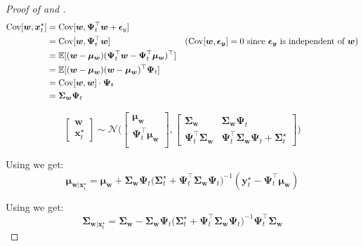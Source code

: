 \documentclass{article}
\begin{document}
\begin{proof}[Proof of  and ]
\begin{align}
  \mathrm{Cov}[\bm{w}, \bm{x}_t^{\star}] &= \mathrm{Cov}[\bm{w}, \bm{\Psi}^\top_t\bm{w} + \bm{\epsilon}_y]\\
                                         &= \mathrm{Cov}[\bm{w}, \bm{\Psi}^\top_t\bm{w}] & ( \mathrm{Cov}[\bm{w}, \bm{\epsilon_y}] = 0 \text{ since } \bm{\epsilon_y} \text{ is independent of } \bm{w})\\
                                         &= \operatorname{\mathbb{E}}[(\bm{w} - \bm{\mu_{w}})(\bm{\Psi}^\top_t\bm{w} - \bm{\Psi}^\top_t\bm{\mu_{w}})^{\top}]\\
                                         &= \operatorname{\mathbb{E}}[(\bm{w} - \bm{\mu_{w}})(\bm{w} - \bm{\mu_{w}})^{\top}\bm{\Psi}_t]\\
                                         &= \mathrm{Cov}[\bm{w}, \bm{w}] \cdot \bm{\Psi}_t\\
                                         &= \bm{\Sigma_{w}} \bm{\Psi}_t
\end{align}

\begin{equation}
  \begin{bmatrix}
    \bm{w} \\
    \bm{x}_t^{\star}
  \end{bmatrix} \sim \mathcal{N}\Bigg(
  \begin{bmatrix}
    \bm{\mu_w} \\
    \bm{\Psi}^\top_t \bm{\mu_w}\\
  \end{bmatrix},
  \begin{bmatrix}
     \bm{\Sigma_w} & \bm{\Sigma_{w}} \bm{\Psi}_t  \\
    \bm{\Psi}^\top_t\bm{\Sigma_w} & \bm{\Psi}^\top_t \bm{\Sigma_w} \bm{\Psi}_t + \bm{\Sigma}^\star_t
  \end{bmatrix}
  \Bigg)
\end{equation}

Using  we get:
\begin{equation}
\bm{\mu}_{\bm{w}|\bm{x}_t^\star} = \bm{\mu_w} + \bm{\Sigma_w}\bm{\Psi}_t \Big(\bm{\Sigma}_t^\star + \bm{\Psi}_t^\top \bm{\Sigma_w}\bm{\Psi}_t \Big)^{-1} (\bm{y}_t^\star - \bm{\Psi}_t^\top \bm{\mu_w})
\end{equation}

Using  we get:
\begin{equation}
\bm{\Sigma}_{\bm{w}|\bm{x}_t^\star} = \bm{\Sigma_w} - \bm{\Sigma_w}\bm{\Psi}_t \Big(\bm{\Sigma}_t^\star +  \bm{\Psi}_t^\top \bm{\Sigma_w}\bm{\Psi}_t \Big)^{-1} \bm{\Psi}_t^\top \bm{\Sigma_w}
\end{equation}
\end{proof}
\end{document}
